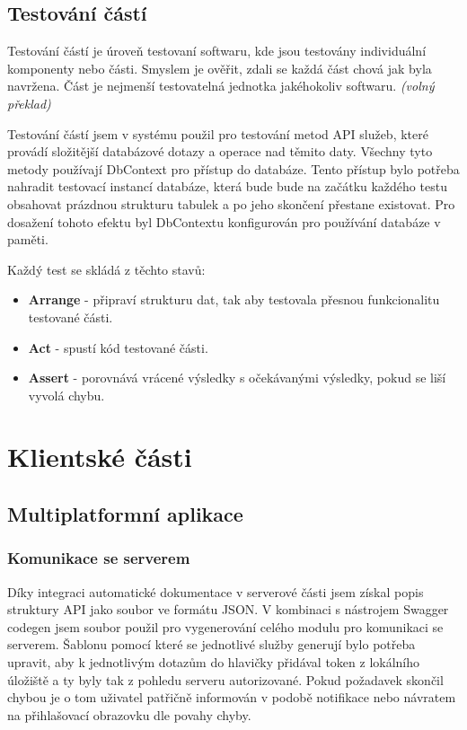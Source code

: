 \documentclass[
  biblatex,
  glossaries,
  index
]{kidiplom}
\begin{document}
\subsection{Testování částí}
Testování částí je úroveň testovaní softwaru, kde jsou testovány individuální komponenty nebo části. Smyslem je ověřit, zdali se každá část chová jak byla navržena. Část je nejmenší testovatelná jednotka jakéhokoliv softwaru.\cite{11} \textit{(volný překlad)}

Testování částí jsem v systému použil pro testování metod API služeb, které provádí složitější databázové dotazy a operace nad těmito daty. Všechny tyto metody používají DbContext pro přístup do databáze. Tento přístup bylo potřeba nahradit testovací instancí databáze, která bude bude na začátku každého testu obsahovat prázdnou strukturu tabulek a po jeho skončení přestane existovat. Pro dosažení tohoto efektu byl DbContextu konfigurován pro používání databáze v paměti.

Každý test se skládá z těchto stavů: 
\begin{itemize}
	\item \textbf{Arrange} - připraví strukturu dat, tak aby testovala přesnou funkcionalitu testované části.
	\item \textbf{Act} - spustí kód testované části.
	\item \textbf{Assert} - porovnává vrácené výsledky s očekávanými výsledky, pokud se liší vyvolá chybu.
\end{itemize}

\newpage

\section{Klientské části}

\subsection{Multiplatformní aplikace}

\subsubsection{Komunikace se serverem}
Díky integraci automatické dokumentace v serverové části jsem získal popis struktury API jako soubor ve formátu JSON. V kombinaci s nástrojem Swagger codegen jsem soubor použil pro vygenerování celého modulu pro komunikaci se serverem. Šablonu pomocí které se jednotlivé služby generují bylo potřeba upravit, aby k jednotlivým dotazům do hlavičky přidával token z lokálního úložiště a ty byly tak z pohledu serveru autorizované. Pokud požadavek skončil chybou je o tom uživatel patřičně informován v podobě notifikace nebo návratem na přihlašovací obrazovku dle povahy chyby.
\end{document}
